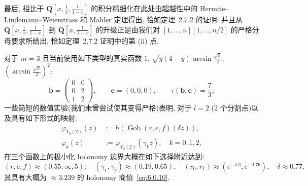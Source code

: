 最后, 相比于 $\mathbf{Q}\left[x,\frac{1}{x},\frac{1}{1-x}\right]$ 的积分精细化在此处由超越性中的 Hermite--Lindemann--Weierstrass 和 Mahler 定理得出, 恰如定理~2.7.2 的证明; 并且从 $\mathbf{Q}\left[x,\frac{1}{x},\frac{1}{1-x}\right]$ 到 $\mathbf{Q}\left[x,\frac{1}{1-x}\right]$ 的升级正是由我们对 $[1,\ldots,n][1,\ldots,n/2]$ 的严格分母要求所给出, 恰如定理~2.7.2 证明中的第 (ii) 点.

\begin{example}\label{exa:6.8.6}
对于 $m=3$ 且当前使用如下类型的真实函数 $1$, $\sqrt{y(4-y)}\arcsin \frac{\sqrt{y}}{2}$, $\left(\arcsin \frac{\sqrt{y}}{2}\right)^2$:
\[ \mathbf{b} = \begin{pmatrix} 0 & 0 \\ 0 & 2 \\ 1 & 2 \end{pmatrix}, \qquad \mathbf{e} = (0, 0, 0), \qquad \tau(\mathbf{b}; \mathbf{e}) = \frac{7}{3}, \]
一些简短的数值实验(我们未曾尝试使其变得严格)表明, 对于 $l = 2$ ($2$ 个分割点)以及具有如下形式的映射:
\[
\begin{aligned}
\varphi_{Y_0(2)}(z) &:= h\left(\operatorname{Gob}(r,e,f)(\delta z)\right), \\
\varphi_k(z) &:= \varphi_{Y_0(2)}\left(\gamma_k z\right), \quad k = 0, 1, 2,
\end{aligned}
\]
在三个函数上的极小化 holonomy 边界大概在如下选择附近达到:
\[ (r, e, f) \approx (0.55, \infty, 5); \quad (\gamma_1, \gamma_2) \approx (0.19, 0.65), \quad (r_0, r_1) \approx (e^{-4.3}, e^{-0.76}), \quad \delta \approx 0.77, \]
其具有大概为 $\approx 3.239$ 的 holonomy 商值~\eqref{eq:6.0.10}. \end{example}
